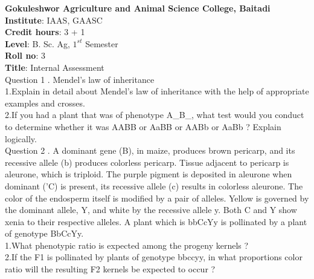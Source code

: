 \documentclass[12pt]{article}\usepackage[]{graphicx}\usepackage[]{color}
\begin{document}
{            \Large{\textbf{Gokuleshwor Agriculture and Animal Science College, Baitadi}} \\[0.25cm]
            \textbf{Institute}: IAAS, GAASC \\}\textbf{Credit hours}: 3 + 1 \\\textbf{Level}: B. Sc. Ag, $1^{st}$ Semester \\\textbf{Roll no}: 3 \\\textbf{Title}: Internal Assessment \\[1cm]Question 1 . Mendel's law of inheritance \\\hspace{0.5cm}1.Explain in detail about Mendel's law of inheritance with the help of appropriate examples and crosses.\\\hspace{0.5cm}2.If you had a plant that was of phenotype A\_B\_, what test would you conduct to determine whether it was AABB or AaBB or AABb or AaBb ? Explain logically.\\Question 2 . A dominant gene (B), in maize, produces brown pericarp, and its recessive allele (b) produces colorless pericarp. Tissue adjacent to pericarp is aleurone, which is triploid. The purple pigment is deposited in aleurone when dominant ('C) is present, its recessive allele (c) results in colorless aleurone. The color of the endosperm itself is modified by a pair of alleles. Yellow is governed by the dominant allele, Y, and white by the recessive allele y. Both C and Y show xenia to their respective alleles. A plant which is bbCcYy is pollinated by a plant of genotype BbCcYy. \\\hspace{0.5cm}1.What phenotypic ratio is expected among the progeny kernels ?\\\hspace{0.5cm}2.If the F1 is pollinated by plants of genotype bbccyy, in what proportions color ratio will the resulting F2 kernels be expected to occur ?\\
\end{document}
